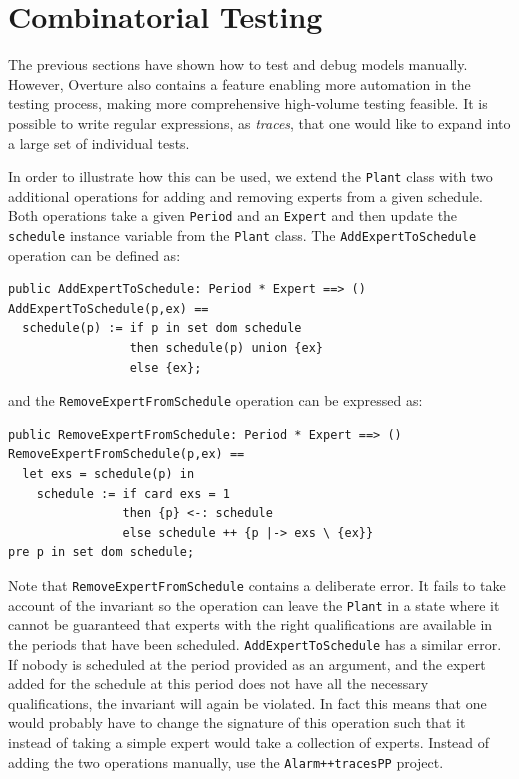\section{Combinatorial Testing}\label{sec:CT}

The previous sections have shown how to test and debug models
manually. However, Overture also contains a feature enabling more
automation in the testing process, making more comprehensive
high-volume testing feasible. It is possible to write regular
expressions, as \emph{traces}, that one would like to expand into a
large set of individual tests.

In order to illustrate how this can be used, we extend the
\texttt{Plant} class with two additional operations for adding and
removing experts from a given schedule. Both operations take a given
\texttt{Period} and an \texttt{Expert} and then update the
\texttt{schedule} instance variable from the \texttt{Plant} class. The
\texttt{AddExpertToSchedule} operation can be defined as:


\begin{lstlisting}
public AddExpertToSchedule: Period * Expert ==> ()
AddExpertToSchedule(p,ex) ==
  schedule(p) := if p in set dom schedule
                 then schedule(p) union {ex}
                 else {ex};
\end{lstlisting}

\noindent and the \texttt{RemoveExpertFromSchedule} operation can
be expressed as:

\begin{lstlisting}
public RemoveExpertFromSchedule: Period * Expert ==> ()
RemoveExpertFromSchedule(p,ex) == 
  let exs = schedule(p) in
    schedule := if card exs = 1
                then {p} <-: schedule
                else schedule ++ {p |-> exs \ {ex}}
pre p in set dom schedule;
\end{lstlisting}

\noindent Note that \texttt{RemoveExpertFromSchedule} contains a
deliberate error. It fails to take account of the invariant so the
operation can leave the \texttt{Plant} in a state where it cannot be
guaranteed that experts with the right qualifications are available in
the periods that have been scheduled. \texttt{AddExpertToSchedule} has
a similar error.  If nobody is scheduled at the period provided as an
argument, and the expert added for the schedule at this period does
not have all the necessary qualifications, the invariant will again be
violated. In fact this means that one would probably have to change
the signature of this operation such that it instead of taking a
simple expert would take a collection of experts. Instead of adding the 
two operations manually, use the \texttt{Alarm++tracesPP} project.

